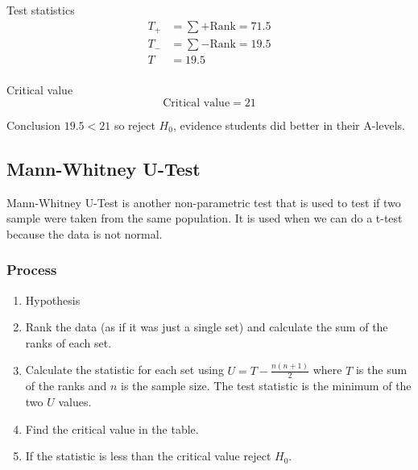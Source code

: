 \begin{example}
        \begin{step}{Test statistics}
        \begin{align*}
        T_+ &= \sum{+ \text{Rank}} = 71.5\\
        T_- &= \sum{- \text{Rank}} = 19.5\\
        T &= 19.5\\
        \end{align*}
        \end{step}
        
        \begin{step}{Critical value}
        $$\text{Critical value} = 21$$
        \end{step}
        
        \begin{step}{Conclusion}
        $19.5 < 21$ so reject $H_0$, evidence students did better in their A-levels.
        \end{step}
        \end{example}
        
    \subsection{Mann-Whitney U-Test}
    
        Mann-Whitney U-Test is another non-parametric test that is used to test if two sample were taken from the same population. It is used when we can do a t-test because the data is not normal.
        
        \subsubsection{Process}
            \begin{enumerate}
                \item Hypothesis
                \item Rank the data (as if it was just a single set) and calculate the sum of the ranks of each set.
                \item Calculate the statistic for each set using $U = T - \displaystyle\frac{n(n+1)}{2}$ where $T$ is the sum of the ranks and $n$ is the sample size. The test statistic is the minimum of the two $U$ values.
                \item Find the critical value in the table.
                \item If the statistic is less than the critical value reject $H_0$.
            \end{enumerate}
   

